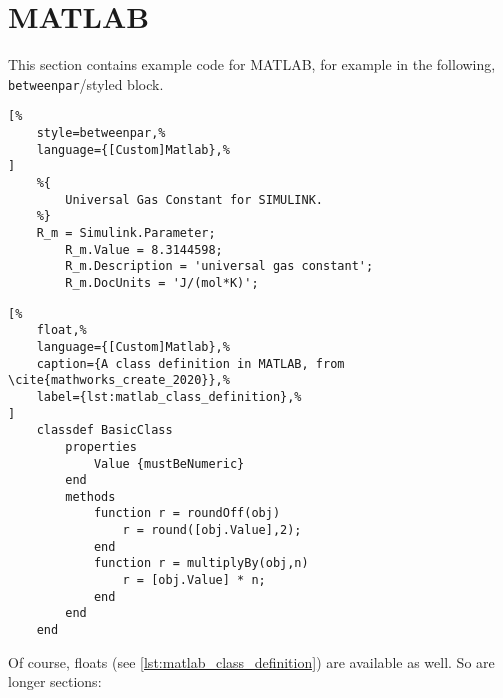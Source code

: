 \section{MATLAB}

This section contains example code for MATLAB, for example in the following,
\texttt{betweenpar}\-/styled block.

\begin{lstlisting}[%
    style=betweenpar,%
    language={[Custom]Matlab},%
]
    %{
        Universal Gas Constant for SIMULINK.
    %}
    R_m = Simulink.Parameter;
        R_m.Value = 8.3144598;
        R_m.Description = 'universal gas constant';
        R_m.DocUnits = 'J/(mol*K)';
\end{lstlisting}

\begin{lstlisting}[%
    float,%
    language={[Custom]Matlab},%
    caption={A class definition in MATLAB, from \cite{mathworks_create_2020}},%
    label={lst:matlab_class_definition},%
]
    classdef BasicClass
        properties
            Value {mustBeNumeric}
        end
        methods
            function r = roundOff(obj)
                r = round([obj.Value],2);
            end
            function r = multiplyBy(obj,n)
                r = [obj.Value] * n;
            end
        end
    end
\end{lstlisting}

Of course, floats (see \cref{lst:matlab_class_definition}) are available as well.
So are longer sections:

